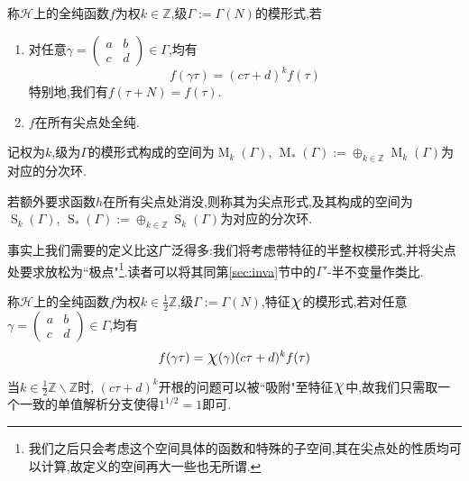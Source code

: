 \begin{defn}
	称$\mathcal{H}$上的全纯函数$f$为权$k \in \mathbb{Z}$,级$\Gamma:= \Gamma(N)$的模形式,若
	
	\begin{enumerate}[(1)]
		\item 对任意$\gamma=\begin{pmatrix}
		a & b\\
		c & d
		\end{pmatrix}\in \Gamma$,均有
		\begin{equation}\label{eq:modform2}
		f(\gamma \tau)=(c \tau +d)^k f(\tau)
		\end{equation}
		特别地,我们有$f(\tau+N)=f(\tau)$.
		\item $f$在所有尖点处全纯.
	\end{enumerate}
	记权为$k$,级为$\Gamma$的模形式构成的空间为$\operatorname{M}_k(\Gamma)$, $\operatorname{M}_{*}(\Gamma):= \oplus_{k \in \mathbb{Z}}\operatorname{M}_k(\Gamma)$为对应的分次环.
	
	若额外要求函数$h$在所有尖点处消没,则称其为尖点形式,及其构成的空间为$\operatorname{S}_k(\Gamma)$, $\operatorname{S}_{*}(\Gamma):= \oplus_{k \in \mathbb{Z}}\operatorname{S}_k(\Gamma)$为对应的分次环.
\end{defn}
\begin{remark}
	事实上我们需要的定义比这广泛得多:我们将考虑带特征的半整权模形式,并将尖点处要求放松为``极点"\footnote{我们之后只会考虑这个空间具体的函数和特殊的子空间,其在尖点处的性质均可以计算,故定义的空间再大一些也无所谓.}.读者可以将其同第\ref{sec:inva}节中的$\Gamma'$-半不变量作类比.
\end{remark}
\begin{defn}
	称$\mathcal{H}$上的全纯函数$f$为权$k \in \frac{1}{2}\mathbb{Z}$,级$\Gamma:= \Gamma(N)$,特征$\mbox{\Large$\chi$}$的模形式,若对任意$\gamma=\begin{pmatrix}
	a & b\\
	c & d
	\end{pmatrix}\in \Gamma$,均有
	\begin{equation}\label{eq:modform3}
	f(\gamma \tau)=\mbox{\Large$\chi$}(\gamma)(c \tau +d)^k f(\tau)
	\end{equation}
\end{defn}
\begin{remark}
	当$k \in \frac{1}{2} \mathbb{Z} \smallsetminus \mathbb{Z}$时, $(c\tau+d)^k$开根的问题可以被``吸附"至特征$\mbox{\Large$\chi$}$中,故我们只需取一个一致的单值解析分支使得$1^{1/2}=1$即可.
\end{remark}



